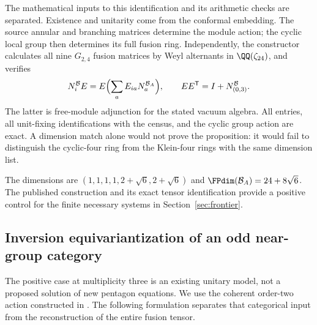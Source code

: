 The mathematical inputs to this identification and its arithmetic
checks are separated. Existence and unitarity come from the conformal
embedding. The source annular and branching matrices determine the
module action; the cyclic local group then determines its full fusion
ring. Independently, the constructor calculates all nine $G_{2,4}$
fusion matrices by Weyl alternants in $\QQ(\zeta_{24})$, and verifies
\[
 N_i^{\mathcal B}E
   =E\Bigl(\sum_a E_{ia}N_a^{\mathcal B_A}\Bigr),\qquad
 EE^{\mathsf T}=I+N_{(0,3)}^{\mathcal B}.
\]
The latter is free-module adjunction for the stated vacuum algebra.
All entries, all unit-fixing identifications with the census, and the
cyclic group action are exact. A dimension match alone would not prove
the proposition: it would fail to distinguish the cyclic-four ring
from the Klein-four rings with the same dimension list.

The dimensions are $(1,1,1,1,2+\sqrt6,2+\sqrt6)$ and
$\FPdim(\mathcal B_A)=24+8\sqrt6$. The published construction and its
exact tensor identification provide a positive control for the finite
necessary systems in Section~\ref{sec:frontier}.

\subsection{Inversion equivariantization of an odd near-group category}
\label{sec:inversion-model}
The positive case at multiplicity three is an existing unitary model,
not a proposed solution of new pentagon equations. We use the coherent
order-two action constructed in \cite[Section~13.3]{Izumi}. The following
formulation separates that categorical input from the reconstruction of
the entire fusion tensor.

